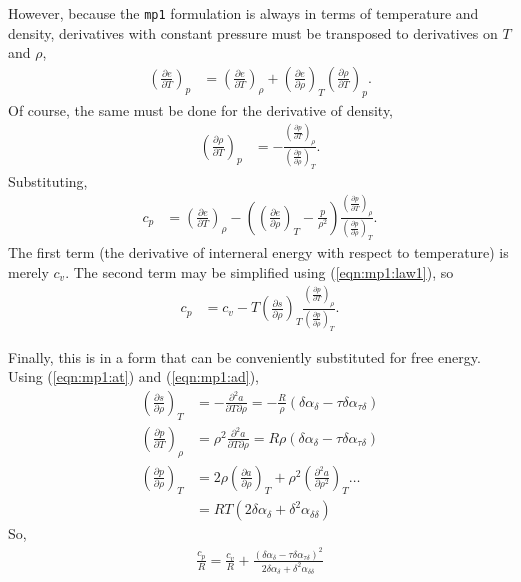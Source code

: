 However, because the \texttt{mp1} formulation is always in terms of temperature and density, derivatives with constant pressure must be transposed to derivatives on $T$ and $\rho$, 
\begin{align*}
\left(\frac{\partial e}{\partial T}\right)_p &=  \left(\frac{\partial e}{\partial T}\right)_\rho +  \left(\frac{\partial e}{\partial \rho}\right)_T  \left(\frac{\partial \rho}{\partial T}\right)_p.
\end{align*}
Of course, the same must be done for the derivative of density,
\begin{align*}
\left(\frac{\partial \rho}{\partial T}\right)_p &= -\frac{ \left(\frac{\partial p}{\partial T}\right)_\rho }{ \left(\frac{\partial p}{\partial \rho}\right)_T }.
\end{align*}
Substituting,
\begin{align*}
c_p &= \left(\frac{\partial e}{\partial T}\right)_\rho - \left(\left(\frac{\partial e}{\partial \rho}\right)_T - \frac{p}{\rho^2}\right) \frac{ \left(\frac{\partial p}{\partial T}\right)_\rho }{ \left(\frac{\partial p}{\partial \rho}\right)_T }.
\end{align*}
The first term (the derivative of interneral energy with respect to temperature) is merely $c_v$.  The second term may be simplified using (\ref{eqn:mp1:law1}), so
\begin{align*}
c_p &= c_v - T\left(\frac{\partial s}{\partial \rho}\right)_T \frac{ \left(\frac{\partial p}{\partial T}\right)_\rho }{ \left(\frac{\partial p}{\partial \rho}\right)_T }.
\end{align*}

Finally, this is in a form that can be conveniently substituted for free energy.  Using (\ref{eqn:mp1:at}) and (\ref{eqn:mp1:ad}),
\begin{align*}
\left(\frac{\partial s}{\partial \rho}\right)_T &= - \frac{\partial^2 a}{\partial T \partial \rho} = - \frac{R}{\rho}\left( \delta \alpha_\delta - \tau \delta \alpha_{\tau\delta} \right)\\
\left(\frac{\partial p}{\partial T}\right)_\rho &= \rho^2 \frac{\partial^2 a}{\partial T \partial \rho} = R \rho \left( \delta \alpha_\delta - \tau \delta \alpha_{\tau\delta} \right)\\
\left(\frac{\partial p}{\partial \rho}\right)_T &= 2 \rho \left(\frac{\partial a}{\partial \rho}\right)_T + \rho^2 \left(\frac{\partial^2 a}{\partial \rho^2}\right)_T \ldots\\
 &= RT \left( 2\delta \alpha_\delta + \delta^2 \alpha_{\delta\delta} \right)
\end{align*}
So, 
\begin{align}
\frac{c_p}{R} = \frac{c_v}{R} + \frac{\left(\delta \alpha_\delta - \tau \delta \alpha_{\tau\delta} \right)^2}{2\delta \alpha_\delta + \delta^2\alpha_{\delta\delta}}
\end{align}

